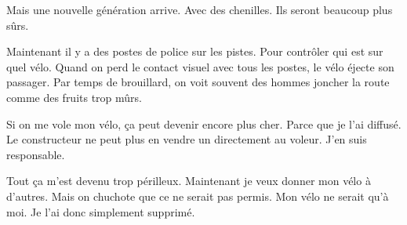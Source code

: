 Mais une nouvelle génération arrive. Avec des chenilles. Ils seront beaucoup plus sûrs.

Maintenant il y a des postes de police sur les pistes. Pour contrôler qui est sur quel vélo. Quand on perd le contact visuel avec tous les postes, le vélo éjecte son passager. Par temps de
brouillard, on voit souvent des hommes joncher la route comme des fruits trop mûrs.

Si on me vole mon vélo, ça peut devenir encore plus cher. Parce que je l’ai diffusé. Le constructeur ne peut plus en vendre un directement au voleur. J’en suis responsable.

Tout ça m’est devenu trop périlleux. Maintenant je veux donner mon vélo à d’autres. Mais on chuchote que ce ne serait pas permis. Mon vélo ne serait qu’à moi. Je l’ai donc simplement
supprimé.
